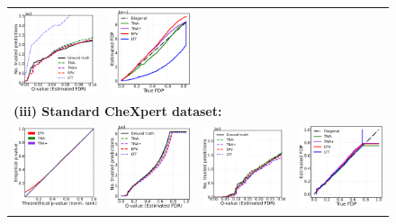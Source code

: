 \documentclass{article}
\begin{document}
\begin{figure}[h!]
\begin{tabular}{cccc}
		\includegraphics[width=0.225\linewidth, height=0.225\linewidth]{img/cnn_pcam_balanced_fdr_control_loc.png} &
		\includegraphics[width=0.225\linewidth, height=0.225\linewidth]{img/cnn_FDPscat_pcam_balanced.png}\\
		\multicolumn{4}{l}{\bf (iii) Standard CheXpert dataset:}\\	
		\includegraphics[width=0.225\linewidth, height=0.225\linewidth]{img/cnn_QQ_chx.png} 		&
		\includegraphics[width=0.225\linewidth, height=0.225\linewidth]{img/cnn_chx_fdr_control.png} & 
		\includegraphics[width=0.225\linewidth, height=0.225\linewidth]{img/cnn_chx_fdr_control_loc.png} & 
		\includegraphics[width=0.225\linewidth, height=0.225\linewidth]{img/cnn_FDPscat_chx.png}\\

\end{tabular}
\end{figure}
\end{document}
